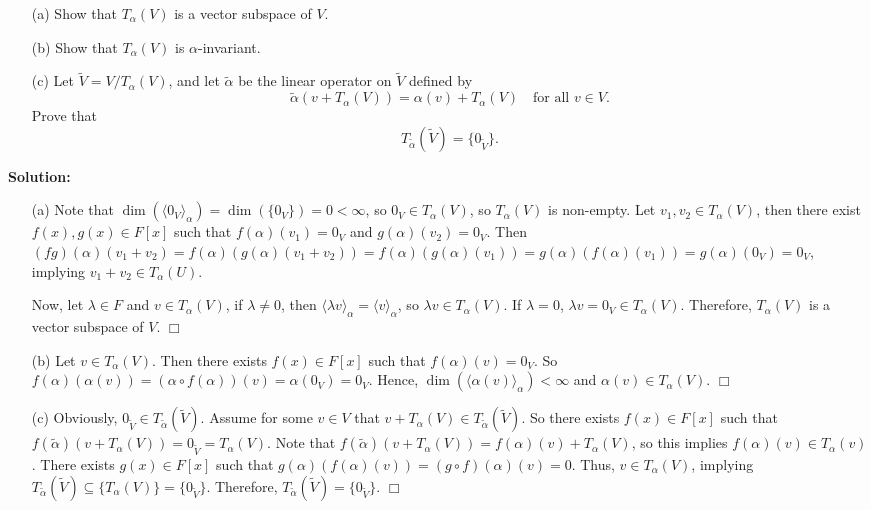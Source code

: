 \documentclass[12pt]{article}
\begin{document}
\begin{enumerate}
    \item[(a)] Show that \(T_\alpha(V)\) is a vector subspace of \(V\).
    \item[(b)] Show that \(T_\alpha(V)\) is \(\alpha\)-invariant.
    \item[(c)] Let \(\widetilde{V} = V / T_\alpha(V)\), and let \(\widetilde{\alpha}\) be the linear operator on \(\widetilde{V}\) defined by 
    \[
    \widetilde{\alpha}(v + T_\alpha(V)) = \alpha(v) + T_\alpha(V) \quad \text{for all } v \in V.
    \]
    Prove that 
    \[
    T_{\widetilde{\alpha}}(\widetilde{V}) = \{ 0_{\widetilde{V}} \}.
    \]
\end{enumerate}
\textbf{Solution:} 
\begin{enumerate}
    \item[(a)] Note that $\dim(\langle 0_V \rangle_\alpha) = \dim(\{0_V\}) = 0 < \infty$, so $0_V \in T_{\alpha}(V)$, so $T_{\alpha}(V)$ is non-empty. Let $v_1, v_2 \in T_{\alpha}(V)$, then there exist $f(x), g(x) \in F[x]$ such that $f(\alpha)(v_1) = 0_V$ and $g(\alpha)(v_2) = 0_V$. Then $(fg)(\alpha)(v_1 + v_2) = f(\alpha)(g(\alpha)(v_1 + v_2)) = f(\alpha)(g(\alpha)(v_1)) = g(\alpha)(f(\alpha)(v_1)) = g(\alpha)(0_V) = 0_V$, implying $v_1 + v_2 \in T_\alpha(U)$.

    \noindent Now, let $\lambda \in F$ and $v \in T_{\alpha}(V)$, if $\lambda \ne 0$, then $\langle \lambda v \rangle_\alpha = \langle v \rangle_\alpha$, so $\lambda v \in T_{\alpha}(V)$. If $\lambda = 0$, $\lambda v = 0_V \in T_{\alpha}(V)$. Therefore, $T_{\alpha}(V)$ is a vector subspace of $V$. \hfill $\Box$
    \item[(b)] Let $v \in T_{\alpha}(V)$. Then there exists $f(x) \in F[x]$ such that $f(\alpha)(v) = 0_V$. So $f(\alpha)(\alpha(v)) = (\alpha \circ f(\alpha))(v) = \alpha(0_V) = 0_V$. Hence, $\dim(\langle \alpha(v) \rangle_\alpha) < \infty$ and $\alpha(v) \in T_\alpha(V)$. \hfill $\Box$
    \item[(c)] Obviously, $0_{\widetilde{V}} \in T_{\widetilde{\alpha}}(\widetilde{V})$. Assume for some $v \in V$ that $v + T_\alpha(V) \in T_{\widetilde{\alpha}}(\widetilde{V})$. So there exists $f(x) \in F[x]$ such that $f(\widetilde{\alpha})(v + T_\alpha(V)) = 0_{\widetilde{V}} = T_\alpha(V)$. Note that $f(\widetilde{\alpha})(v + T_\alpha(V)) = f(\alpha)(v) + T_\alpha(V)$, so this implies $f(\alpha)(v) \in T_\alpha(v)$. There exists $g(x) \in F[x]$ such that $g(\alpha)(f(\alpha)(v)) = (g \circ f)(\alpha)(v) = 0$. Thus, $v \in T_{\alpha}(V)$, implying $T_{\widetilde{\alpha}}(\widetilde{V}) \subseteq \{T_\alpha(V)\} = \{0_{\widetilde{V}}\}$. Therefore, $T_{\widetilde{\alpha}}(\widetilde{V}) = \{ 0_{\widetilde{V}} \}$. \hfill $\Box$
    \end{enumerate}
\end{document}
